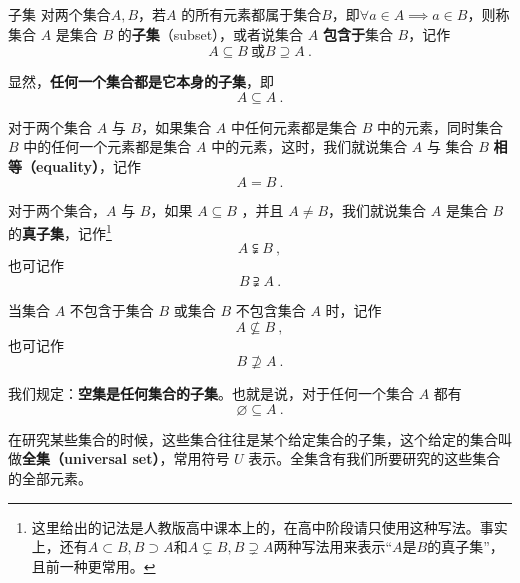 \begin{definition}{子集}
对两个集合$A,B$，若$A$ 的所有元素都属于集合$B$，即$\forall a\in A\implies a\in B$，则称集合 $A$ 是集合 $B$ 的\textbf{子集}（subset），或者说集合 $A$ \textbf{包含于}集合 $B$，记作
\begin{equation}
A \subseteq B~\text{或}B \supseteq A~.
\end{equation}
\end{definition}

显然，\textbf{任何一个集合都是它本身的子集}，即
\begin{equation}
A \subseteq A~.
\end{equation}

对于两个集合 $A$ 与 $B$，如果集合 $A$ 中任何元素都是集合 $B$ 中的元素，同时集合 $B$ 中的任何一个元素都是集合 $A$ 中的元素，这时，我们就说集合 $A$ 与 集合 $B$ \textbf{相等（equality）}，记作
\begin{equation}
A=B~.
\end{equation}

对于两个集合，$A$ 与 $B$，如果 $A\subseteq B$ ，并且 $A \ne B$，我们就说集合 $A$ 是集合 $B$ 的\textbf{真子集}，记作\footnote{这里给出的记法是人教版高中课本上的，在高中阶段请只使用这种写法。事实上，还有$A\subset B,B\supset A$和$A\subsetneq B,B\supsetneq A$两种写法用来表示“$A$是$B$的真子集”，且前一种更常用。}
\begin{equation}
A \subsetneqq B~,
\end{equation}
也可记作
\begin{equation}
B \supsetneqq A~.
\end{equation}


当集合 $A$ 不包含于集合 $B$ 或集合 $B$ 不包含集合 $A$ 时，记作
\begin{equation}
A \nsubseteq B~,
\end{equation}
也可记作
\begin{equation}
B \nsupseteq A~.
\end{equation}

我们规定：\textbf{空集是任何集合的子集}。也就是说，对于任何一个集合 $A$ 都有
\begin{equation}
\varnothing \subseteq A~.
\end{equation}

在研究某些集合的时候，这些集合往往是某个给定集合的子集，这个给定的集合叫做\textbf{全集（universal set）}，常用符号 $U$ 表示。全集含有我们所要研究的这些集合的全部元素。


